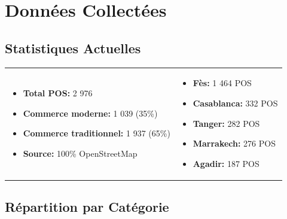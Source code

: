 \documentclass[11pt,a4paper]{article}
\begin{document}

\section{Données Collectées}

\subsection{Statistiques Actuelles}

\begin{center}
\begin{tabular}{ll}
\begin{minipage}{0.45\textwidth}
\begin{successbox}
\begin{itemize}[leftmargin=*,nosep]
    \item \textbf{Total POS:} 2 976
    \item \textbf{Commerce moderne:} 1 039 (35\%)
    \item \textbf{Commerce traditionnel:} 1 937 (65\%)
    \item \textbf{Source:} 100\% OpenStreetMap
\end{itemize}
\end{successbox}
\end{minipage}
&
\begin{minipage}{0.45\textwidth}
\begin{highlightbox}
\begin{itemize}[leftmargin=*,nosep]
    \item \textbf{Fès:} 1 464 POS
    \item \textbf{Casablanca:} 332 POS
    \item \textbf{Tanger:} 282 POS
    \item \textbf{Marrakech:} 276 POS
    \item \textbf{Agadir:} 187 POS
\end{itemize}
\end{highlightbox}
\end{minipage}
\end{tabular}
\end{center}

\subsection{Répartition par Catégorie}
\end{document}
